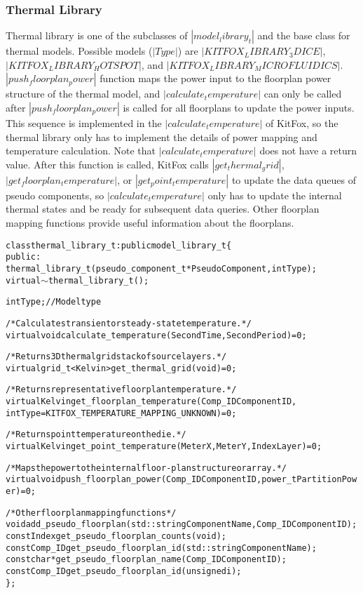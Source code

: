 \subsubsection{Thermal Library}
Thermal library is one of the subclasses of $|model_library_t|$ and the base class for thermal models. 
Possible models ($|Type|$) are $|KITFOX_LIBRARY_3DICE|$, $|KITFOX_LIBRARY_HOTSPOT|$, and $|KITFOX_LIBRARY_MICROFLUIDICS|$. 
$|push_floorplan_power|$ function maps the power input to the floorplan power structure of the thermal model, and $|calculate_temperature|$ can only be called after $|push_floorplan_power|$ is called for all floorplans to update the power inputs. 
This sequence is implemented in the $|calculate_temperature|$ of KitFox, so the thermal library only has to implement the details of power mapping and temperature calculation. 
Note that $|calculate_temperature|$ does not have a return value. 
After this function is called, KitFox calls $|get_thermal_grid|$, $|get_floorplan_temperature|$, or $|get_point_temperature|$ to update the data queues of pseudo components, so $|calculate_temperature|$ only has to update the internal thermal states and be ready for subsequent data queries. 
Other floorplan mapping functions provide useful information about the floorplans.

{
\fontsize{10pt}{11pt}\selectfont
\begin{alltt}
class thermal_library_t : public model_library_t \{
public:
    thermal_library_t(pseudo_component_t *PseudoComponent, int Type);
    virtual \(\sim\)thermal_library_t();
    
    int Type; // Model type

    /* Calculates transient or steady-state temperature. */
    virtual void calculate_temperature(Second Time, Second Period) = 0;
    
    /* Returns 3D thermal grid stack of source layers. */
    virtual grid_t<Kelvin> get_thermal_grid(void) = 0;
    
    /* Returns representative floorplan temperature. */
    virtual Kelvin get_floorplan_temperature(Comp_ID ComponentID, 
                   int Type = KITFOX_TEMPERATURE_MAPPING_UNKNOWN) = 0;
    
    /* Returns point temperature on the die. */
    virtual Kelvin get_point_temperature(Meter X, Meter Y, Index Layer) = 0;
    
    /* Maps the power to the internal floor-plan structure or array. */
    virtual void push_floorplan_power(Comp_ID ComponentID, power_t PartitionPower) = 0;

    /* Other floorplan mapping functions */
    void add_pseudo_floorplan(std::string ComponentName, Comp_ID ComponentID);
    const Index get_pseudo_floorplan_counts(void);
    const Comp_ID get_pseudo_floorplan_id(std::string ComponentName);
    const char* get_pseudo_floorplan_name(Comp_ID ComponentID);
    const Comp_ID get_pseudo_floorplan_id(unsigned i);
\};
\end{alltt}
}

